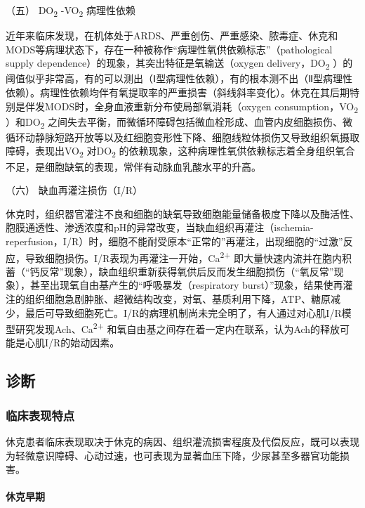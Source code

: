 \hypertarget{text00055.htmlux5cux23CHP2-1-1-2-5}{}
（五） DO\textsubscript{2} -VO\textsubscript{2} 病理性依赖

近年来临床发现，在机体处于ARDS、严重创伤、严重感染、脓毒症、休克和MODS等病理状态下，存在一种被称作“病理性氧供依赖标志”（pathological
supply dependence）的现象，其突出特征是氧输送（oxygen
delivery，DO\textsubscript{2}
）的阈值似乎非常高，有的可以测出（Ⅰ型病理性依赖），有的根本测不出（Ⅱ型病理性依赖）。病理性依赖均伴有氧提取率的严重损害（斜线斜率变化）。休克在其后期特别是伴发MODS时，全身血液重新分布使局部氧消耗（oxygen
consumption，VO\textsubscript{2} ）和DO\textsubscript{2}
之间失去平衡，而微循环障碍包括微血栓形成、血管内皮细胞损伤、微循环动静脉短路开放等以及红细胞变形性下降、细胞线粒体损伤又导致组织氧摄取障碍，表现出VO\textsubscript{2}
对DO\textsubscript{2}
的依赖现象，这种病理性氧供依赖标志着全身组织氧合不足，是细胞缺氧的表现，常伴有动脉血乳酸水平的升高。

\hypertarget{text00055.htmlux5cux23CHP2-1-1-2-6}{}
（六） 缺血再灌注损伤（I/R）

休克时，组织器官灌注不良和细胞的缺氧导致细胞能量储备极度下降以及酶活性、胞膜通透性、渗透浓度和pH的异常改变，当缺血组织再灌注（ischemia-reperfusion，I/R）时，细胞不能耐受原本“正常的”再灌注，出现细胞的“过激”反应，导致细胞损伤。I/R表现为再灌注一开始，Ca\textsuperscript{2+}
即大量快速内流并在胞内积蓄（“钙反常”现象），缺血组织重新获得氧供后反而发生细胞损伤（“氧反常”现象），甚至出现氧自由基产生的“呼吸暴发（respiratory
burst）”现象，结果使再灌注的组织细胞急剧肿胀、超微结构改变，对氧、基质利用下降，ATP、糖原减少，最后可导致细胞死亡。I/R的病理机制尚未完全明了，有人通过对心肌I/R模型研究发现Ach、Ca\textsuperscript{2+}
和氧自由基之间存在着一定内在联系，认为Ach的释放可能是心肌I/R的始动因素。

\subsection{诊断}

\subsubsection{临床表现特点}

休克患者临床表现取决于休克的病因、组织灌流损害程度及代偿反应，既可以表现为轻微意识障碍、心动过速，也可表现为显著血压下降，少尿甚至多器官功能损害。

\paragraph{休克早期}

